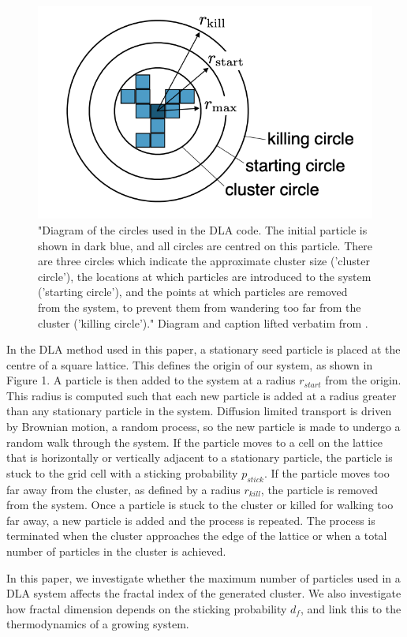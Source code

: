 \documentclass[11pt]{iopart}
\begin{document}
\begin{figure}[h]
  \centering
  \includegraphics[width=0.5\linewidth]{images/circles.png}
  \caption{"Diagram of the circles used in the DLA code. The initial particle is shown in dark blue, and all circles are centred on this particle. There are three circles which indicate the approximate cluster size ('cluster circle'), the locations at which particles are introduced to the system ('starting circle'), and the points at which particles are removed from the system, to prevent them from wandering too far from the cluster ('killing circle')." Diagram and caption lifted verbatim from \cite{handout}.}
  \label{fig:circles}
\end{figure}

In the DLA method used in this paper, a stationary seed particle is placed at the centre of a square lattice. This defines the origin of our system, as shown in Figure 1. A particle is then added to the system at a radius $r_{start}$ from the origin. This radius is computed such that each new particle is added at a radius greater than any stationary particle in the system. Diffusion limited transport is driven by Brownian motion, a random process, so the new particle is made to undergo a random walk through the system. If the particle moves to a cell on the lattice that is horizontally or vertically adjacent to a stationary particle, the particle is stuck to the grid cell with a sticking probability $p_{stick}$. If the particle moves too far away from the cluster, as defined by a radius $r_{kill}$, the particle is removed from the system. Once a particle is stuck to the cluster or killed for walking too far away, a new particle is added and the process is repeated. The process is terminated when the cluster approaches the edge of the lattice or when a total number of particles in the cluster is achieved.

In this paper, we investigate whether the maximum number of particles used in a DLA system affects the fractal index of the generated cluster. We also investigate how fractal dimension depends on the sticking probability $d_f$, and link this to the thermodynamics of a growing system.
\end{document}
